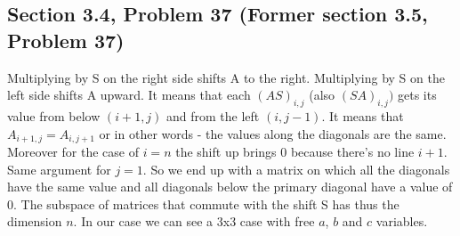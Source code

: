 \documentclass[a4paper,11pt]{article}
\begin{document}
\subsection*{Section 3.4, Problem 37  (Former section 3.5, Problem 37)}
Multiplying by S on the right side shifts A to the right.
Multiplying by S on the left side shifts A upward.
It means that each $(AS)_{i,j}$ (also $(SA)_{i,j})$ gets its value from below $(i+1,j)$ and from the left $(i,j-1)$. It means that $A_{i+1,j}=A_{i,j+1}$ or in other words - the values along the diagonals are the same. Moreover for the case of $i=n$ the shift up brings 0 because there's no line $i+1$. Same argument for $j=1$. So we end up with a matrix on which all the diagonals have the same value and all diagonals below the primary diagonal have a value of $0$.
The subspace of matrices that commute with the shift S has thus the dimension $n$. In our case we can see a 3x3 case with free $a$, $b$ and $c$ variables. 
\end{document}
